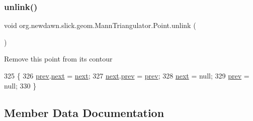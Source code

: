 \subsubsection{\texorpdfstring{unlink()}{unlink()}}
{\footnotesize\ttfamily void org.\+newdawn.\+slick.\+geom.\+Mann\+Triangulator.\+Point.\+unlink (\begin{DoxyParamCaption}{ }\end{DoxyParamCaption})\hspace{0.3cm}{\ttfamily [inline]}}

Remove this point from it\textquotesingle{}s contour 
\begin{DoxyCode}
325                              \{
326             \mbox{\hyperlink{classorg_1_1newdawn_1_1slick_1_1geom_1_1_mann_triangulator_1_1_point_aada0547222c51b32a918839db2eca9f2}{prev}}.\mbox{\hyperlink{classorg_1_1newdawn_1_1slick_1_1geom_1_1_mann_triangulator_1_1_point_a5679974de3d6ea0e554138b1d4e19123}{next}} = \mbox{\hyperlink{classorg_1_1newdawn_1_1slick_1_1geom_1_1_mann_triangulator_1_1_point_a5679974de3d6ea0e554138b1d4e19123}{next}};
327             \mbox{\hyperlink{classorg_1_1newdawn_1_1slick_1_1geom_1_1_mann_triangulator_1_1_point_a5679974de3d6ea0e554138b1d4e19123}{next}}.\mbox{\hyperlink{classorg_1_1newdawn_1_1slick_1_1geom_1_1_mann_triangulator_1_1_point_aada0547222c51b32a918839db2eca9f2}{prev}} = \mbox{\hyperlink{classorg_1_1newdawn_1_1slick_1_1geom_1_1_mann_triangulator_1_1_point_aada0547222c51b32a918839db2eca9f2}{prev}};
328             \mbox{\hyperlink{classorg_1_1newdawn_1_1slick_1_1geom_1_1_mann_triangulator_1_1_point_a5679974de3d6ea0e554138b1d4e19123}{next}} = null;
329             \mbox{\hyperlink{classorg_1_1newdawn_1_1slick_1_1geom_1_1_mann_triangulator_1_1_point_aada0547222c51b32a918839db2eca9f2}{prev}} = null;
330         \}
\end{DoxyCode}


\subsection{Member Data Documentation}
\mbox{\label{classorg_1_1newdawn_1_1slick_1_1geom_1_1_mann_triangulator_1_1_point_adbff3dca6beaef071adb22b814f0e7ae}} 
